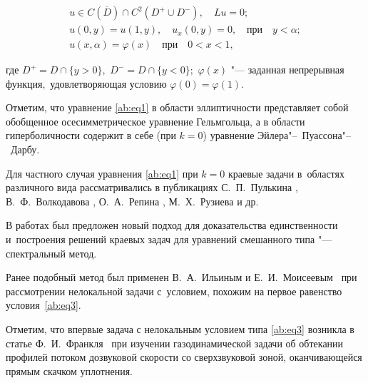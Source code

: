 \begin{gather}

\label{ab:eq2}

u\in C(\overline{D})\cap C^2(D^+\cup D^-),\quad Lu=0;

\\

\label{ab:eq3}

 u(0, y)=u(1, y),\quad u_x(0, y)=0,\quad \text{при} \quad y<\alpha;

\\

\label{ab:eq4}

u(x,\alpha)=\varphi(x) \quad \text{при} \quad 0<x<1,

\end{gather}

где $D^{+}=D\cap\{y>0\},$ $D^{-}=D\cap\{y<0\};$ $\varphi(x)$ "--- заданная непрерывная функция$,$ удовлетворяющая условию $\varphi(0)=\varphi(1).$



\rm



\smallskip



Отметим, что уравнение \eqref{ab:eq1} в области эллиптичности представляет собой обобщенное осесимметрическое уравнение Гельмгольца, а в области гиперболичности содержит в себе (при $k=0$) уравнение Эйлера"--~Пуассона"--~Дарбу. 

Для частного случая уравнения \eqref{ab:eq1} при $k=0$ краевые задачи в~областях различного вида рассматривались в публикациях С.~П.~Пулькина \cite{ab:bib:Pulkin}, В.~Ф.~Волкодавова \cite{ab:bib:Volkodavov}, О.~А.~Репина \cite{ab:bib:Repin}, М.~Х.~Рузиева \cite{ab:bib:Ruziev} и др.



В работах \cite{ab:bib:Sabitov, ab:bib:SabitovSuleimanova} был предложен новый подход для доказательства единственности и~построения решений краевых задач для уравнений смешанного типа "--- спектральный метод. 

Ранее подобный метод был применен В.~А.~Ильиным и Е.~И.~Моисеевым~\cite{ab:bib:Il'inMoiseev} при рассмотрении нелокальной задачи с~условием, похожим на первое равенство условия~\eqref{ab:eq3}. 



Отметим, что впервые задача с нелокальным условием типа \eqref{ab:eq3} возникла в статье  Ф.~И.~Франкля~\cite{ab:bib:Francl} при изучении газодинамической задачи об обтекании профилей потоком дозвуковой скорости со сверхзвуковой зоной, оканчивающейся прямым скачком уплотнения. 

